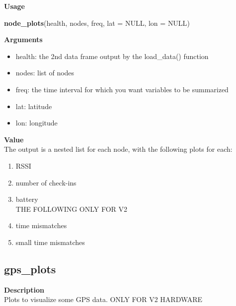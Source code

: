 \documentclass[
]{book}
\newenvironment{Shaded}{\begin{snugshade}}{\end{snugshade}}
\newcommand{\DataTypeTok}[1]{\textcolor[rgb]{0.13,0.29,0.53}{#1}}
\newcommand{\KeywordTok}[1]{\textcolor[rgb]{0.13,0.29,0.53}{\textbf{#1}}}
\newcommand{\NormalTok}[1]{#1}
\newcommand{\OtherTok}[1]{\textcolor[rgb]{0.56,0.35,0.01}{#1}}
\providecommand{\tightlist}{%
  \setlength{\itemsep}{0pt}\setlength{\parskip}{0pt}}
\begin{document}
\textbf{Usage}

\begin{Shaded}
\begin{Highlighting}[]
\KeywordTok{node_plots}\NormalTok{(health, nodes, freq, }\DataTypeTok{lat =} \OtherTok{NULL}\NormalTok{, }\DataTypeTok{lon =} \OtherTok{NULL}\NormalTok{)}
\end{Highlighting}
\end{Shaded}

\textbf{Arguments}

\begin{itemize}
\tightlist
\item
  health: the 2nd data frame output by the load\_data() function\\
\item
  nodes: list of nodes\\
\item
  freq: the time interval for which you want variables to be summarized\\
\item
  lat: latitude\\
\item
  lon: longitude
\end{itemize}

\textbf{Value}\\
The output is a nested list for each node, with the following plots for each:

\begin{enumerate}
\def\labelenumi{\arabic{enumi}.}
\tightlist
\item
  RSSI\\
\item
  number of check-ins\\
\item
  battery\\
  THE FOLLOWING ONLY FOR V2\\
\item
  time mismatches\\
\item
  small time mismatches
\end{enumerate}

\hypertarget{gps_plots}{%
\subsection{gps\_plots}\label{gps_plots}}

\textbf{Description}\\
Plots to visualize some GPS data. ONLY FOR V2 HARDWARE
\end{document}
